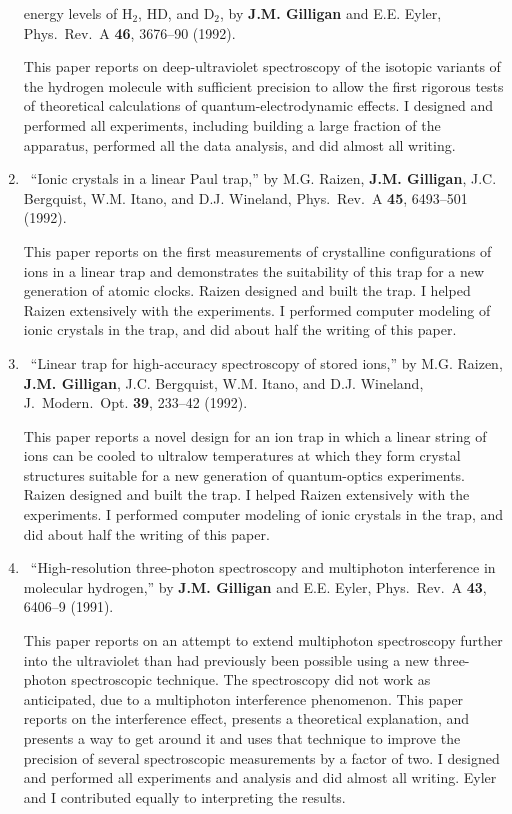 \begin{enumerate}
{	  energy levels of {H$_2$}, {HD}, and {D$_2$},}  by \textbf{J.M. Gilligan} and E.E.
	  Eyler, Phys.\ Rev.\ A \textbf{46}, 3676--90 (1992).
	  \begin{credit}
	  This paper reports on deep-ultraviolet spectroscopy of the isotopic variants of the hydrogen molecule with sufficient precision to allow the first rigorous tests of theoretical calculations of quantum-electrodynamic effects. I designed and performed all experiments, including building a large fraction of the apparatus, performed all the data analysis, and did almost all writing.
	  \end{credit}
%	
	\item
	\textdagger\ 
	\enquote{Ionic crystals in a linear {P}aul trap,}  by M.G. Raizen, \textbf{J.M.
	  Gilligan}, J.C. Bergquist, W.M. Itano, and D.J. Wineland, Phys.\ Rev.\ A
	  \textbf{45}, 6493--501 (1992). 
	  \begin{credit}
	  This paper reports on the first measurements of crystalline configurations of ions in a linear trap and demonstrates the suitability of this trap for a new generation of atomic clocks. Raizen designed and built the trap. I helped Raizen extensively with the experiments. I performed computer modeling of ionic crystals in the trap, and did about half the writing of this paper.
	  \end{credit}
%	
	\item
	\textdagger\ 
	\enquote{Linear trap for high-accuracy spectroscopy of stored ions,}  by M.G.
	  Raizen, \textbf{J.M. Gilligan}, J.C. Bergquist, W.M. Itano, and D.J. Wineland, J.\
	  Modern.\ Opt. \textbf{39}, 233--42 (1992). 
	  \begin{credit}
	  This paper reports a novel design for an ion trap in which a linear string of ions can be cooled to ultralow temperatures at which they form crystal structures suitable for a new generation of quantum-optics experiments. Raizen designed and built the trap. I helped Raizen extensively with the experiments. I performed computer modeling of ionic crystals in the trap, and did about half the writing of this paper.
	  \end{credit}
%	
	\item
	\textdagger\ 
	\enquote{High-resolution three-photon spectroscopy and multiphoton interference
	  in molecular hydrogen,}  by \textbf{J.M. Gilligan} and E.E. Eyler, Phys.\ Rev.\ A
	  \textbf{43}, 6406--9 (1991). 
	  \begin{credit}
	  This paper reports on an attempt to extend multiphoton spectroscopy further into the ultraviolet than had previously been possible using a new three-photon spectroscopic technique. The spectroscopy did not work as anticipated, due to a multiphoton interference phenomenon. This paper reports on the interference effect, presents a theoretical explanation, and presents a way to get around it and uses that technique to improve the precision of several spectroscopic measurements by a factor of two. I designed and performed all experiments and analysis and did almost all writing. Eyler and I contributed equally to interpreting the results.

\end{credit}
\end{enumerate}
